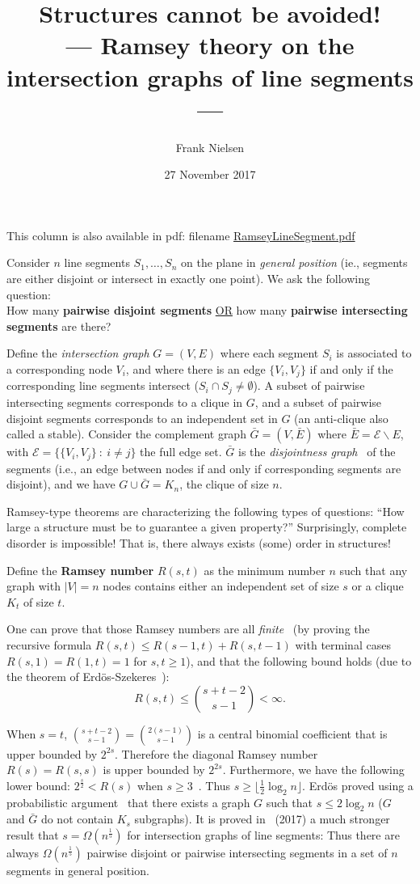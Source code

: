 \documentclass[11pt]{article}
\title{Structures cannot be avoided!\\--- Ramsey theory on the intersection graphs of line segments ---}
\date{27 November 2017}
\author{Frank Nielsen}
\def\calE{\mathcal{E}}
\begin{document}
\maketitle


This column is also available in pdf: filename \url{RamseyLineSegment.pdf} 
\vskip 0.5cm
 
Consider $n$ line segments $S_1,\ldots, S_n$ on the plane in {\em general position} (ie., segments are either disjoint or intersect in exactly one point).
We ask the following question:\\
How many {\bf pairwise disjoint segments} \underline{OR} how many {\bf pairwise intersecting segments} are there?

Define the {\em intersection graph} $G=(V,E)$ where each segment $S_i$ is associated to a corresponding node $V_i$, and where there is an edge 
$\{V_i,V_j\}$ if and only if the corresponding line segments intersect ($S_i\cap S_j\not=\emptyset$).  
A subset of pairwise intersecting segments corresponds to a clique in $G$, and
a subset of pairwise disjoint segments corresponds to an independent set in $G$ (an anti-clique also called a stable).
Consider the complement graph $\bar{G}=(V,\bar E)$ where $\bar E=\calE\backslash E$, with $\calE=\{\{V_i,V_j\}\ :\ i\not =j\}$ the full edge set.
$\bar G$ is the {\em disjointness graph}~\cite{RamseySegment-2017} of the segments (i.e., an edge between nodes if and only if corresponding segments are disjoint), and we have $G\cup \bar G=K_n$, the clique of size $n$.

Ramsey-type theorems are characterizing the following types of questions:
``How large a structure must  be to guarantee a given property?''
Surprisingly, complete disorder is impossible! 
That is, there always exists  (some) order in structures!

Define the {\bf Ramsey number} $R(s,t)$ as the minimum number $n$ such that any graph with $|V|=n$ nodes
contains either an independent set of size $s$ or a clique $K_t$ of size $t$.

One can prove that those Ramsey numbers are all {\em finite}~\cite{Ramsey-2009} (by proving the recursive formula $R(s,t)\leq R(s-1,t)+R(s,t-1)$ with terminal cases $R(s,1)=R(1,t)=1$ for $s,t\geq 1$), and that the following bound holds (due to the theorem of Erd\"os-Szekeres~\cite{ES-1935}):
$$
R(s,t)\leq \binom{s+t-2}{s-1} <\infty.
$$
 


When $s=t$, $\binom{s+t-2}{s-1}=\binom{2(s-1)}{s-1}$ is a central binomial coefficient that is upper bounded by $2^{2s}$.
Therefore the diagonal Ramsey number $R(s)=R(s,s)$ is upper bounded by $2^{2s}$.
Furthermore, we have the following lower bound: $2^{\frac{s}{2}}< R(s)$ when $s\geq 3$~\cite{ES-1935}.
Thus $s\geq \lfloor \frac{1}{2}\log_2 n \rfloor$.  
Erd\"os proved using a probabilistic argument~\cite{Erdos-1947} that there exists a graph $G$ such that $s\leq 2\log_2 n$ ($G$ and $\bar G$ do not contain $K_s$ subgraphs).
It is proved in~\cite{RamseySegment-2017} (2017) a much stronger result that $s=\Omega(n^{\frac{1}{5}})$ for intersection graphs of line segments: 
Thus there are always $\Omega(n^{\frac{1}{5}})$ pairwise disjoint or pairwise intersecting segments in a set of $n$ segments in general position.
\end{document}
